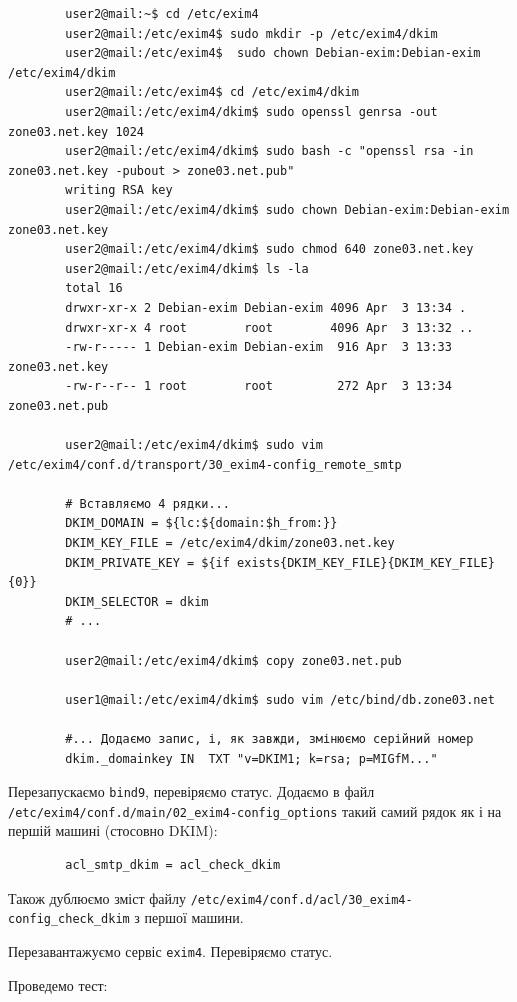 \documentclass[14pt, a4paper]{extreport}
\begin{document}
	\begin{verbatim}
		user2@mail:~$ cd /etc/exim4
		user2@mail:/etc/exim4$ sudo mkdir -p /etc/exim4/dkim
		user2@mail:/etc/exim4$  sudo chown Debian-exim:Debian-exim /etc/exim4/dkim
		user2@mail:/etc/exim4$ cd /etc/exim4/dkim
		user2@mail:/etc/exim4/dkim$ sudo openssl genrsa -out zone03.net.key 1024
		user2@mail:/etc/exim4/dkim$ sudo bash -c "openssl rsa -in zone03.net.key -pubout > zone03.net.pub"
		writing RSA key
		user2@mail:/etc/exim4/dkim$ sudo chown Debian-exim:Debian-exim zone03.net.key 
		user2@mail:/etc/exim4/dkim$ sudo chmod 640 zone03.net.key 
		user2@mail:/etc/exim4/dkim$ ls -la
		total 16
		drwxr-xr-x 2 Debian-exim Debian-exim 4096 Apr  3 13:34 .
		drwxr-xr-x 4 root        root        4096 Apr  3 13:32 ..
		-rw-r----- 1 Debian-exim Debian-exim  916 Apr  3 13:33 zone03.net.key
		-rw-r--r-- 1 root        root         272 Apr  3 13:34 zone03.net.pub
		
		user2@mail:/etc/exim4/dkim$ sudo vim /etc/exim4/conf.d/transport/30_exim4-config_remote_smtp
		
		# Вставляємо 4 рядки...
		DKIM_DOMAIN = ${lc:${domain:$h_from:}}
		DKIM_KEY_FILE = /etc/exim4/dkim/zone03.net.key
		DKIM_PRIVATE_KEY = ${if exists{DKIM_KEY_FILE}{DKIM_KEY_FILE}{0}}
		DKIM_SELECTOR = dkim
		# ...
		
		user2@mail:/etc/exim4/dkim$ copy zone03.net.pub
		
		user1@mail:/etc/exim4/dkim$ sudo vim /etc/bind/db.zone03.net 
		
		#... Додаємо запис, і, як завжди, змінюємо серійний номер
		dkim._domainkey	IN	TXT	"v=DKIM1; k=rsa; p=MIGfM..."
	\end{verbatim}
	
	Перезапускаємо \texttt{bind9}, перевіряємо статус. Додаємо в файл \texttt{/etc/exim4/conf.d/main/02\_exim4-config\_options} такий самий рядок як і на першій машині (стосовно DKIM):
	
	\begin{verbatim}
		acl_smtp_dkim = acl_check_dkim
	\end{verbatim}
	
	Також дублюємо зміст файлу \texttt{/etc/exim4/conf.d/acl/30\_exim4-config\_check\_dkim} з першої машини.
	
	Перезавантажуємо сервіс \texttt{exim4}. Перевіряємо статус.
	
	Проведемо тест:
	
\end{document}
